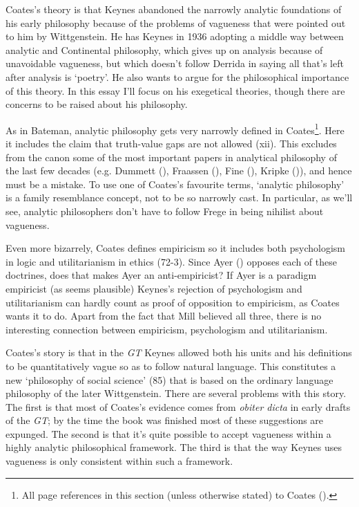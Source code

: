 \documentclass[
  11pt,
  letterpaper,
  DIV=11,
  numbers=noendperiod,
  twoside]{scrartcl}
\begin{document}
Coates's theory is that Keynes abandoned the narrowly analytic
foundations of his early philosophy because of the problems of vagueness
that were pointed out to him by Wittgenstein. He has Keynes in 1936
adopting a middle way between analytic and Continental philosophy, which
gives up on analysis because of unavoidable vagueness, but which doesn't
follow Derrida in saying all that's left after analysis is `poetry'. He
also wants to argue for the philosophical importance of this theory. In
this essay I'll focus on his exegetical theories, though there are
concerns to be raised about his philosophy.

As in Bateman, analytic philosophy gets very narrowly defined in
Coates\footnote{All page references in this section (unless otherwise
  stated) to Coates ().}. Here it
includes the claim that truth-value gaps are not allowed (xii). This
excludes from the canon some of the most important papers in analytical
philosophy of the last few decades (e.g. Dummett
(), Fraassen
(), Fine
(), Kripke
()), and hence must be a mistake. To use
one of Coates's favourite terms, `analytic philosophy' is a family
resemblance concept, not to be so narrowly cast. In particular, as we'll
see, analytic philosophers don't have to follow Frege in being nihilist
about vagueness.

Even more bizarrely, Coates defines empiricism so it includes both
psychologism in logic and utilitarianism in ethics (72-3). Since Ayer
() opposes each of these doctrines, does
that makes Ayer an anti-empiricist? If Ayer is a paradigm empiricist (as
seems plausible) Keynes's rejection of psychologism and utilitarianism
can hardly count as proof of opposition to empiricism, as Coates wants
it to do. Apart from the fact that Mill believed all three, there is no
interesting connection between empiricism, psychologism and
utilitarianism.

Coates's story is that in the \emph{GT} Keynes allowed both his units
and his definitions to be quantitatively vague so as to follow natural
language. This constitutes a new `philosophy of social science' (85)
that is based on the ordinary language philosophy of the later
Wittgenstein. There are several problems with this story. The first is
that most of Coates's evidence comes from \emph{obiter dicta} in early
drafts of the \emph{GT}; by the time the book was finished most of these
suggestions are expunged. The second is that it's quite possible to
accept vagueness within a highly analytic philosophical framework. The
third is that the way Keynes uses vagueness is only consistent within
such a framework.
\end{document}
